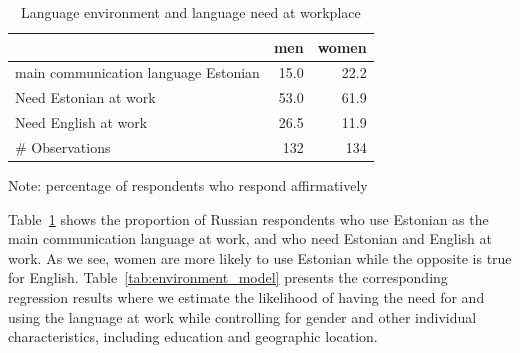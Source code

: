 \documentclass[12pt, a4paper]{article}
\begin{document}
\begin{table}[t]         
	\centering
	\caption{Language environment and language need at workplace}
	\label{tab:environment_descriptive}
	\begin{tabular}{lrr}
		\toprule
		                   & men & women \\
		\midrule
		main communication language Estonian & 15.0 & 22.2 \\
		Need Estonian at work        & 53.0 & 61.9 \\
		Need English at work        & 26.5 & 11.9 \\
		\midrule
		\# Observations             & 132 & 134  \\
		\bottomrule
	\end{tabular}
	\begin{flushleft}
		Note: percentage of respondents who respond affirmatively
	\end{flushleft}
\end{table}

Table~\ref{tab:environment_descriptive} shows the proportion of
Russian respondents who use Estonian as the main communication language at work, and
who need Estonian and English at work. As we see, women are more likely to
use Estonian while the opposite is true for English.
Table~\ref{tab:environment_model} presents the corresponding regression results
where we estimate the likelihood of having the need for and using the
language at work
while
controlling for gender and other individual
characteristics, including education and geographic location.
\end{document}
